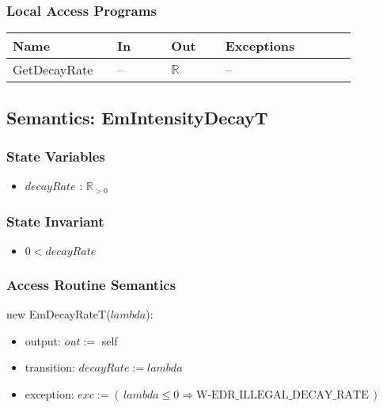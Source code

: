 \subsubsection{Local Access Programs}
\begin{center}
    \renewcommand{\arraystretch}{1.2}
    \small
    \begin{tabular}{m{0.27\linewidth} m{0.14\linewidth} m{0.14\linewidth}
            m{0.34\linewidth}}
        \toprule
        \textbf{Name} & \textbf{In} & \textbf{Out} & \textbf{Exceptions} \\
        \midrule

        \rowcolor[gray]{0.9}GetDecayRate & -- & $\mathbb{R}$ & -- \\

        \bottomrule
    \end{tabular}
\end{center}

\clearpage\subsection{Semantics: EmIntensityDecayT}

\subsubsection{State Variables}
\begin{itemize}

    \item $\mathit{decayRate}$ : $ \mathbb{R}_{>0} $

\end{itemize}

\subsubsection{State Invariant}
\begin{itemize}

    \item $ 0 < \mathit{decayRate} $

\end{itemize}

\subsubsection{Access Routine Semantics}

\noindent new EmDecayRateT($\mathit{lambda}$):
\begin{itemize}

    \item output: $out :=$ self

    \item transition: $\mathit{decayRate} := \mathit{lambda}$

    \item exception: $exc := ( \, \mathit{lambda} \leq 0 \Rightarrow
    \text{W-EDR\_ILLEGAL\_DECAY\_RATE} \, )$

\end{itemize}

